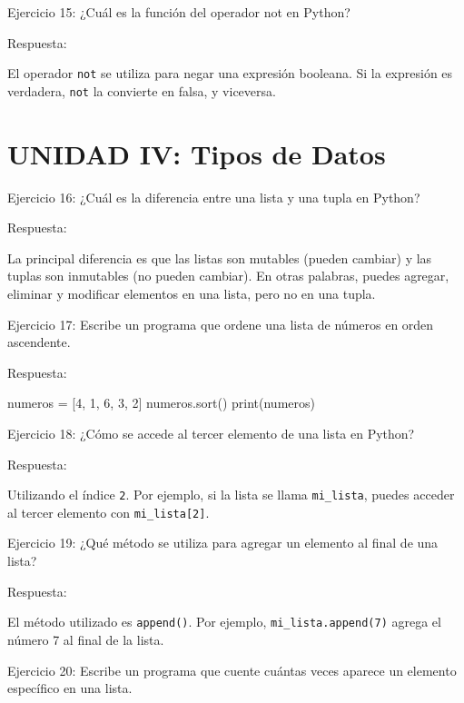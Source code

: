 \documentclass[
  a4paper,
  DIV=11,
  numbers=noendperiod,
  onepage,
  openany]{scrreprt}
\newenvironment{Shaded}{\begin{snugshade}}{\end{snugshade}}
\newcommand{\BuiltInTok}[1]{\textcolor[rgb]{0.00,0.23,0.31}{#1}}
\newcommand{\DecValTok}[1]{\textcolor[rgb]{0.68,0.00,0.00}{#1}}
\newcommand{\NormalTok}[1]{\textcolor[rgb]{0.00,0.23,0.31}{#1}}
\newcommand{\OperatorTok}[1]{\textcolor[rgb]{0.37,0.37,0.37}{#1}}
\begin{document}
Ejercicio 15: ¿Cuál es la función del operador not en Python?

Respuesta:

El operador \texttt{not} se utiliza para negar una expresión booleana.
Si la expresión es verdadera, \texttt{not} la convierte en falsa, y
viceversa.

\hypertarget{unidad-iv-tipos-de-datos-1}{%
\section{UNIDAD IV: Tipos de Datos}\label{unidad-iv-tipos-de-datos-1}}

Ejercicio 16: ¿Cuál es la diferencia entre una lista y una tupla en
Python?

Respuesta:

La principal diferencia es que las listas son mutables (pueden cambiar)
y las tuplas son inmutables (no pueden cambiar). En otras palabras,
puedes agregar, eliminar y modificar elementos en una lista, pero no en
una tupla.

Ejercicio 17: Escribe un programa que ordene una lista de números en
orden ascendente.

Respuesta:

\begin{Shaded}
\begin{Highlighting}[]
\NormalTok{numeros }\OperatorTok{=}\NormalTok{ [}\DecValTok{4}\NormalTok{, }\DecValTok{1}\NormalTok{, }\DecValTok{6}\NormalTok{, }\DecValTok{3}\NormalTok{, }\DecValTok{2}\NormalTok{]}
\NormalTok{numeros.sort()}
\BuiltInTok{print}\NormalTok{(numeros)}
\end{Highlighting}
\end{Shaded}

Ejercicio 18: ¿Cómo se accede al tercer elemento de una lista en Python?

Respuesta:

Utilizando el índice \texttt{2}. Por ejemplo, si la lista se llama
\texttt{mi\_lista}, puedes acceder al tercer elemento con
\texttt{mi\_lista{[}2{]}}.

Ejercicio 19: ¿Qué método se utiliza para agregar un elemento al final
de una lista?

Respuesta:

El método utilizado es \texttt{append()}. Por ejemplo,
\texttt{mi\_lista.append(7)} agrega el número 7 al final de la lista.

Ejercicio 20: Escribe un programa que cuente cuántas veces aparece un
elemento específico en una lista.
\end{document}
